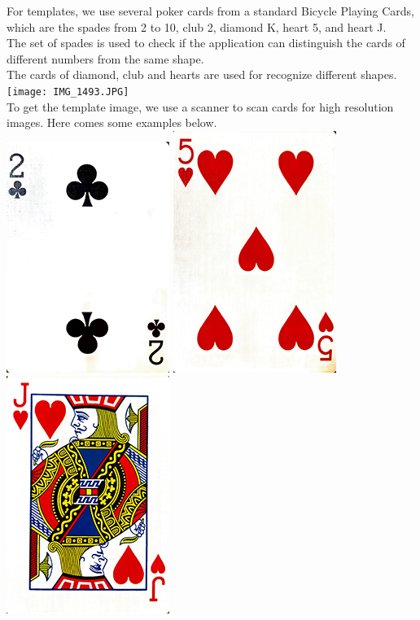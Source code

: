 \documentclass{article}
\begin{document}
For templates, we use several poker cards from a standard Bicycle Playing Cards, which are the spades from 2 to 10, club 2, diamond K, heart 5, and heart J.\\
The set of spades is used to check if the application can distinguish the cards of different numbers from the same shape.\\
The cards of diamond, club and hearts are used for recognize different shapes.\\
\texttt{[image: IMG\_1493.JPG]}
\\
To get the template image, we use a scanner to scan cards for high resolution images. Here comes some examples below.\\
\includegraphics[scale=0.5]{club2.png}
\includegraphics[scale=0.5]{heart5.png}
\includegraphics[scale=0.5]{heartJ.png}
\end{document}
